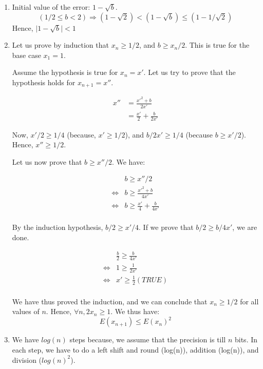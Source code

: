 \begin{ExerciseList}
\begin{enumerate}
\item Initial value of the error: $1 - \sqrt{b}$. 
\[
(1/2 \le b < 2) \Rightarrow (1 - \sqrt{2}) < (1 - \sqrt{b}) \le (1 - 1/\sqrt{2}) 
\]
Hence, $\mid 1 - \sqrt{b} \mid < 1$
\item 
Let us prove by induction that $x_n \ge 1/2$, and $b \ge x_n / 2$. 
This is true for the base case $x_1 = 1$. 

Assume the hypothesis is true for $x_n = x'$.
Let us try to prove that the hypothesis holds for $x_{n+1} = x''$.

\begin{equation}
\begin{split}
x'' & = \frac{x'^2 + b}{2x'} \\
   & = \frac{x'}{2} + \frac{b}{2x'} 
\end{split}
\end{equation}

Now, $x'/2 \ge 1/4$ (because, $x' \ge 1/2$), and $b/2x' \ge 1/4$ (because $b \ge x' / 2$).
Hence, $x'' \ge 1/2$.

Let us now prove that $b \ge x''/2$. We have:

\begin{equation}
\begin{split}
 & b \ge x''/2  \\
\Leftrightarrow & b \ge \frac{x'^2 + b}{4x'} \\
\Leftrightarrow & b \ge \frac{x'}{4} + \frac{b}{4x'} \\
\end{split}
\end{equation} 

By the induction hypothesis, $b/2 \ge x'/4$. 
If we prove that $b/2 \ge b/4x'$, we are done.

\begin{equation}
\begin{split}
& \frac{b}{2} \ge  \frac{b}{4x'} \\
\Leftrightarrow & 1 \ge \frac{1}{2x'} \\
\Leftrightarrow & x' \ge \frac{1}{2} (TRUE) \\ 
\end{split}
\end{equation}


We have thus proved the induction, and we can conclude that $x_n \ge 1/2$ for all values of $n$. 
Hence, $\forall n,2x_n \ge 1$.
We thus have: 
\[
E(x_{n+1}) \le E(x_n)^2 
\]

\item We have $log(n)$ steps because, we assume that the precision is till $n$ bits. In each step, 
we have to do a left shift and round (log(n)), addition (log(n)), and division ($log(n)^2$).


\end{enumerate}
\end{ExerciseList}
